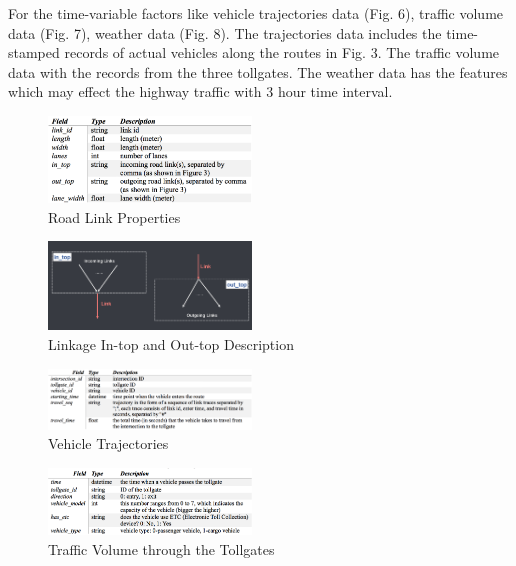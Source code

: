 \documentclass[journal, letterpaper]{IEEEtran}
\begin{document}
For the time-variable factors like vehicle trajectories data (Fig. 6), traffic volume data (Fig. 7), weather data (Fig. 8). The trajectories data includes the time-stamped records of actual vehicles along the routes in Fig. 3. The traffic volume data with the records from the three tollgates. The weather data has the features which may effect the highway traffic with 3 hour time interval.



\begin{figure} [H]
  \centering
  \includegraphics[width=0.48\textwidth]{road-link.png}
  \caption{Road Link Properties}
  \label{fig:4}
\end{figure}
\begin{figure} [H]
  \centering
  \includegraphics[width=0.48\textwidth]{in-out.png}
  \caption{Linkage In-top and Out-top Description}
  \label{fig:5}
\end{figure}

\begin{figure} [H]
  \centering
  \includegraphics[width=0.48\textwidth]{trajectories.png}
  \caption{Vehicle Trajectories}
  \label{fig:6}
\end{figure}

\begin{figure} [H]
  \centering
  \includegraphics[width=0.48\textwidth]{volume.png}
  \caption{Traffic Volume through the Tollgates}
  \label{fig:7}
\end{figure}
\end{document}
